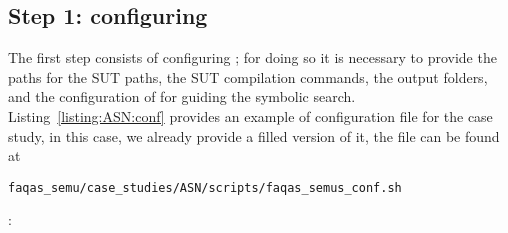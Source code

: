 \subsection{Step 1: configuring \SEMUS}

The first step consists of configuring \SEMUS; for doing so it is necessary to provide the paths for the SUT paths, the SUT compilation commands, the output folders, and the configuration of \SEMU for guiding the symbolic search. Listing~\ref{listing:ASN:conf} provides an example of configuration file for the case study, in this case, we already provide a filled version of it, the file can be found at \begin{footnotesize}\texttt{faqas\_semu/case\_studies/ASN/scripts/faqas\_semus\_conf.sh}\end{footnotesize}: 


